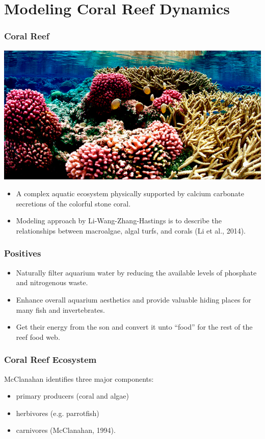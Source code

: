\documentclass{beamer}
\begin{document}
\section{Modeling Coral Reef Dynamics}

\begin{frame}
\frametitle{Coral Reef}
\includegraphics[scale=.175]{./US-Wildlife-coral-1.jpg}
\begin{itemize}
\item A complex aquatic ecosystem physically supported by calcium carbonate secretions of the colorful stone coral. \\
\item Modeling approach by Li-Wang-Zhang-Hastings is to describe the relationships between macroalgae, algal turfs, and corals (Li et al., 2014).
\end{itemize}
\end{frame}

\begin{frame}
\frametitle{Positives}
\begin{itemize}
\item Naturally filter aquarium water by reducing the available levels of phosphate and nitrogenous waste.
\item Enhance overall aquarium aesthetics and provide valuable hiding places for many fish and invertebrates.
\item Get their energy from the son and convert it unto “food” for the rest of the reef food web. 
\end{itemize}
\end{frame}

\begin{frame}
\frametitle{Coral Reef Ecosystem} 

McClanahan identifies three major components:
\begin{itemize}
\item primary producers (coral and algae)\\
\item herbivores (e.g. parrotfish)\\
\item carnivores (McClanahan, 1994).
\end{itemize}
\end{frame}
\end{document}
